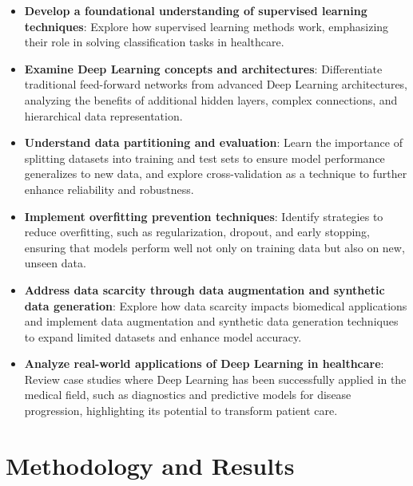 \documentclass{article}
\begin{document}
\begin{itemize}
	\item \textbf{Develop a foundational understanding of supervised learning techniques}: Explore how supervised learning methods work, emphasizing their role in solving classification tasks in healthcare.
	
	\item \textbf{Examine Deep Learning concepts and architectures}: Differentiate traditional feed-forward networks from advanced Deep Learning architectures, analyzing the benefits of additional hidden layers, complex connections, and hierarchical data representation.
	
	\item \textbf{Understand data partitioning and evaluation}: Learn the importance of splitting datasets into training and test sets to ensure model performance generalizes to new data, and explore cross-validation as a technique to further enhance reliability and robustness.
	
	\item \textbf{Implement overfitting prevention techniques}: Identify strategies to reduce overfitting, such as regularization, dropout, and early stopping, ensuring that models perform well not only on training data but also on new, unseen data.
	
	\item \textbf{Address data scarcity through data augmentation and synthetic data generation}: Explore how data scarcity impacts biomedical applications and implement data augmentation and synthetic data generation techniques to expand limited datasets and enhance model accuracy.
	
	\item \textbf{Analyze real-world applications of Deep Learning in healthcare}: Review case studies where Deep Learning has been successfully applied in the medical field, such as diagnostics and predictive models for disease progression, highlighting its potential to transform patient care.
\end{itemize}

\section{Methodology and Results}
\end{document}
